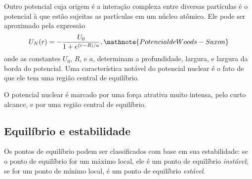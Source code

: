 Outro potencial cuja origem é a interação complexa entre diversas partículas é o potencial à que estão sujeitas as partículas em um núcleo atômico. Ele pode ser aproximado pela expressão
\begin{equation}
    U_N(r) = - \frac{U_0}{1 + e^{(r - R) / a}}, \mathnote{Potencial de Woods-Saxon}
\end{equation}
%
onde as constantes $U_0$, $R$, e $a$, determinam a profundidade, largura, e largura da borda do potencial. Uma característica notável do potencial nuclear é o fato de que ele tem uma região central de equilíbrio.

\begin{marginfigure}[-12cm]
\centering
{}
\caption{O potencial nuclear é marcado por uma força atrativa muito intensa, pelo curto alcance, e por uma região central de equilíbrio.}
\end{marginfigure}

\subsection{Equilíbrio e estabilidade}

Os pontos de equilíbrio podem ser classificados com base em sua estabilidade: se o ponto de equilíbrio for um máximo local, ele é um ponto de equilíbrio \emph{instável}; se for um ponto de mínimo local, é um ponto de equilíbrio \emph{estável}.

